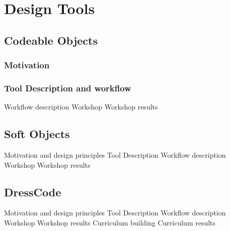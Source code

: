 \chapter{Design Tools}

	\section{Codeable Objects}
		
		\subsection{Motivation}
		\subsection{Tool Description and workflow}
		Workflow description
		Workshop
		Workshop results

	\section{Soft Objects}
		Motivation and design principles
		Tool Description
		Workflow description
		Workshop
		Workshop results
		
	\section{DressCode}
		Motivation and design principles
		Tool Description
		Workflow description
		Workshop
		Workshop results
		Curriculum building
		Curriculum results
